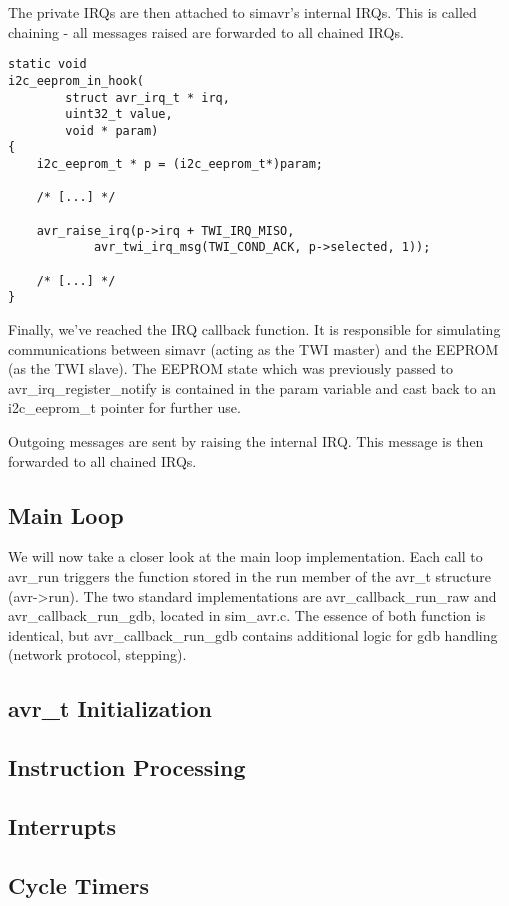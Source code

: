 The private IRQs are then attached to simavr's internal IRQs. This is called
chaining - all messages raised are forwarded to all chained IRQs.

\begin{lstlisting}
static void
i2c_eeprom_in_hook(
		struct avr_irq_t * irq,
		uint32_t value,
		void * param)
{
	i2c_eeprom_t * p = (i2c_eeprom_t*)param;

    /* [...] */

    avr_raise_irq(p->irq + TWI_IRQ_MISO,
            avr_twi_irq_msg(TWI_COND_ACK, p->selected, 1));

    /* [...] */
}
\end{lstlisting}

Finally, we've reached the IRQ callback function. It is responsible for
simulating communications between simavr (acting as the TWI master) and the
EEPROM (as the TWI slave). The EEPROM state which was previously passed to
avr\_irq\_register\_notify is contained in the param variable and cast back to
an i2c\_eeprom\_t pointer for further use.

Outgoing messages are sent by raising the internal IRQ. This message is then
forwarded to all chained IRQs.

\subsection{Main Loop}

We will now take a closer look at the main loop implementation. Each call to
avr\_run triggers the function stored in the run member of the avr\_t structure
(avr->run). The two standard implementations are avr\_callback\_run\_raw and
avr\_callback\_run\_gdb, located in sim\_avr.c. The essence of both function is
identical, but avr\_callback\_run\_gdb contains additional logic for gdb
handling (network protocol, stepping).


\subsection{avr\_t Initialization}
\subsection{Instruction Processing}
\subsection{Interrupts}
\subsection{Cycle Timers}
